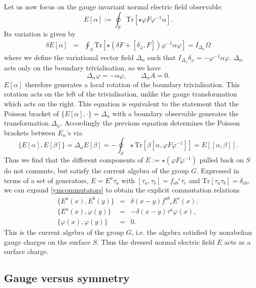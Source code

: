 \documentclass[a4paper,11pt]{article}
\newcommand{\be}{\begin{equation}}
\newcommand{\ee}{\end{equation}}
\newcommand{\bea}{\begin{eqnarray}}
\newcommand{\eea}{\end{eqnarray}}
\newcommand{\Tr}{\mbox{Tr}}
\begin{document}
Let us now focus on the gauge invariant normal electric field observable:
\be
E[\alpha] := \oint_S \Tr[  \star \varphi F \varphi^{-1} \alpha].
\ee
Its variation is given by 
\bea
\delta E[\alpha] &=& \oint_S \Tr\left[\star \left(\delta F + [\delta_\varphi, F]\right) \varphi^{-1}\alpha\varphi \right] = I_{{\Delta}_\alpha } \Omega
\eea
where we define the variational vector field $\Delta_\alpha$ such that $I_{\Delta_\alpha} \delta_\varphi  =- \varphi^{-1}\alpha \varphi$. 
$\Delta_\alpha$ acts only on the boundary trivialisation, so we have
\be \label{Deltaalpha}
\Delta_\alpha \varphi = - \alpha \varphi,\qquad \Delta_\alpha A=0.
\ee
$E[\alpha]$ therefore generates a local rotation of the boundary trivialisation. This rotation acts on the left of the trivialisation, unlike the gauge transformation which acts on the right.
This equation is equivalent to the statement that the Poisson bracket of $\{E[\alpha],\cdot\} =\Delta_\alpha$ with a boundary observable generates the transformation $\Delta_\alpha$.
Accordingly the previous equation determines the Poisson brackets between $E_\alpha$'s  via
\be \label{ymcommutators}
\{ E[\alpha], E[\beta] \} = \Delta_\alpha E[\beta] = -\oint_S \star \Tr[\beta [\alpha,\varphi F\varphi^{-1}]] = E[{[\alpha,\beta]}].
\ee 
Thus we find that the different components of $E:=\star (\varphi F\varphi^{-1})$ pulled back on $S$ do not commute, but satisfy the current algebra of the group $G$.
Expressed in terms of a set of generators, $E = E^a \tau_a$ with $[\tau_a,\tau_b] = f_{ab}{}^c \tau_c$ and $\Tr[\tau_a \tau_b] = \delta_{ab}$, we can expand \eqref{ymcommutators} to obtain the explicit commutation relations
\bea
\{  E^a(x),  E^b(y) \} &=& \delta(x - y) f^{ab}{}_{c} E^c(x),\\
\{  E^a(x), \varphi(y) \} &=& -\delta(x - y)  \tau^a \varphi(x),\\
\{ \varphi(x), \varphi(y) \} &=& 0.
\eea 
This is the current algebra of the group $G$, i.e. the algebra satisfied by nonabelian gauge charges on the surface $S$.
Thus the dressed normal electric field $E$ acts as a surface charge.

\subsection{Gauge versus symmetry }
\end{document}
